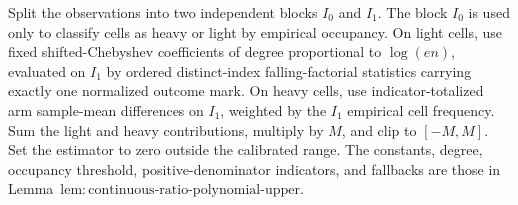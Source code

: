 Split the observations into two independent blocks \(I_0\) and \(I_1\).  The block \(I_0\) is used only to classify cells as heavy or light by empirical occupancy.  On light cells, use fixed shifted-Chebyshev coefficients of degree proportional to \(\log(en)\), evaluated on \(I_1\) by ordered distinct-index falling-factorial statistics carrying exactly one normalized outcome mark.  On heavy cells, use indicator-totalized arm sample-mean differences on \(I_1\), weighted by the \(I_1\) empirical cell frequency.  Sum the light and heavy contributions, multiply by \(M\), and clip to \([-M,M]\).  Set the estimator to zero outside the calibrated range.  The constants, degree, occupancy threshold, positive-denominator indicators, and fallbacks are those in Lemma~\(\mathrm{lem:continuous\text{-}ratio\text{-}polynomial\text{-}upper}\).